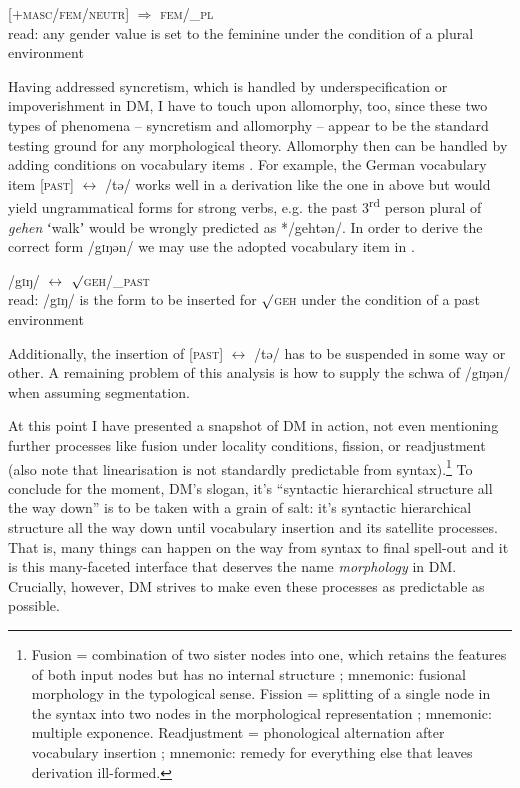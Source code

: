 \documentclass[output=paper]{langsci/langscibook}
\begin{document}
\ea \label{ex:reiner:17} 
[+\textsc{masc}/\textsc{fem}/\textsc{neutr}] ${\Rightarrow}$ \textsc{fem}/\_\textsc{pl}\\
read: any gender value is set to the feminine under the condition of a plural environment
\z

Having addressed syncretism, which is handled by underspecification or impoverishment in DM, I have to touch upon allomorphy, too, since these two types of phenomena – syncretism and allomorphy – appear to be the standard testing ground for any morphological theory. Allomorphy then can be handled by adding conditions on vocabulary items \citep[169]{Embick2015}. For example, the German vocabulary item [\textsc{past}] $\leftrightarrow $ /tə/ works well in a derivation like the one in  above but would yield ungrammatical forms for strong verbs, e.g. the past 3\textsuperscript{rd} person plural of \textit{gehen} ʻwalkʼ would be wrongly predicted as */gehtən/. In order to derive the correct form /g\textsc{i}ŋən/ we may use the adopted vocabulary item in .

\ea \label{ex:reiner:18}
/g\textsc{i}ŋ/ $\leftrightarrow $ ${\surd}$\textsc{geh}/\_\textsc{past}\\
  read: /g\textsc{i}ŋ/ is the form to be inserted for ${\surd}$\textsc{geh} under the condition of a past environment
\z

Additionally, the insertion of [\textsc{past}] $\leftrightarrow $ /tə/ has to be suspended in some way or other. A remaining problem of this analysis is how to supply the schwa of /g\textsc{i}ŋən/ when assuming  segmentation.

At this point I have presented a snapshot of DM in action, not even mentioning further processes like fusion under locality conditions, fission, or readjustment (also note that linearisation is not standardly predictable from syntax).\footnote{Fusion = combination of two sister nodes into one, which retains the features of both input nodes but has no internal structure \citep[15]{Bobaljik2017}; mnemonic: fusional morphology in the typological sense.  Fission = splitting of a single node in the syntax into two nodes in the morphological representation \citep[19]{Bobaljik2017}; mnemonic: multiple exponence. Readjustment = phonological alternation after vocabulary insertion \citep[7]{Bobaljik2017}; mnemonic: remedy for everything else that leaves derivation ill-formed.} To conclude for the moment, DM’s slogan, it’s “syntactic hierarchical structure all the way down” \citep[3]{HarleyHarley1999} is to be taken with a grain of salt: it’s syntactic hierarchical structure all the way down until vocabulary insertion and its satellite processes. That is, many things can happen on the way from syntax to final spell-out and it is this many-faceted interface that deserves the name \textit{morphology} in DM. Crucially, however, DM strives to make even these processes as predictable as possible.
\end{document}
